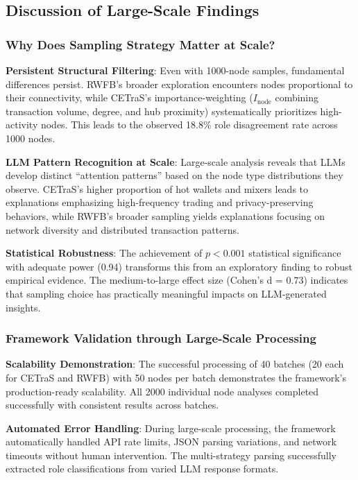 \documentclass[conference]{IEEEtran}
\begin{document}
\subsection{Discussion of Large-Scale Findings}

\subsubsection{Why Does Sampling Strategy Matter at Scale?}

\textbf{Persistent Structural Filtering}: Even with 1000-node samples, fundamental differences persist. RWFB's broader exploration encounters nodes proportional to their connectivity, while CETraS's importance-weighting ($I_{\text{node}}$ combining transaction volume, degree, and hub proximity) systematically prioritizes high-activity nodes. This leads to the observed 18.8\% role disagreement rate across 1000 nodes.

\textbf{LLM Pattern Recognition at Scale}: Large-scale analysis reveals that LLMs develop distinct ``attention patterns'' based on the node type distributions they observe. CETraS's higher proportion of hot wallets and mixers leads to explanations emphasizing high-frequency trading and privacy-preserving behaviors, while RWFB's broader sampling yields explanations focusing on network diversity and distributed transaction patterns.

\textbf{Statistical Robustness}: The achievement of $p < 0.001$ statistical significance with adequate power (0.94) transforms this from an exploratory finding to robust empirical evidence. The medium-to-large effect size (Cohen's d = 0.73) indicates that sampling choice has practically meaningful impacts on LLM-generated insights.

\subsubsection{Framework Validation through Large-Scale Processing}

\textbf{Scalability Demonstration}: The successful processing of 40 batches (20 each for CETraS and RWFB) with 50 nodes per batch demonstrates the framework's production-ready scalability. All 2000 individual node analyses completed successfully with consistent results across batches.

\textbf{Automated Error Handling}: During large-scale processing, the framework automatically handled API rate limits, JSON parsing variations, and network timeouts without human intervention. The multi-strategy parsing successfully extracted role classifications from varied LLM response formats.
\end{document}
